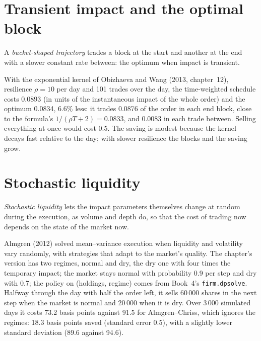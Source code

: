 \section{Transient impact and the optimal block}

\begin{definition}\label{def:mx:beyond-almgren-chriss:bucket}
A \emph{bucket-shaped trajectory} trades a block at the start and another at the end with a slower constant rate between:
the optimum when impact is transient.
\end{definition}

With the exponential kernel of Obizhaeva and Wang (2013, chapter~12), resilience $\rho=10$ per day and 101 trades over the day, the time-weighted schedule
costs 0.0893 (in units of the instantaneous impact of the whole order) and the optimum 0.0834, 6.6\% less: it trades 0.0876 of the order in each end block,
close to the formula's $1/(\rho T+2)=0.0833$, and 0.0083 in each trade between. Selling everything at once would cost 0.5. The saving is modest because the
kernel decays fast relative to the day; with slower resilience the blocks and the saving grow.

\section{Stochastic liquidity}

\begin{definition}\label{def:mx:beyond-almgren-chriss:stochliq}
\emph{Stochastic liquidity} lets the impact parameters themselves change at random during the execution, as volume and
depth do, so that the cost of trading now depends on the state of the market now.
\end{definition}

Almgren (2012) solved mean--variance execution when liquidity and volatility vary randomly, with strategies that adapt to the market's quality. The
chapter's version has two regimes, normal and dry, the dry one with four times the temporary impact; the market stays normal with probability 0.9 per
step and dry with 0.7; the policy on (holdings, regime) comes from Book~4's \texttt{firm.dpsolve}. Halfway through the day with half the order left, it
sells 60\,000 shares in the next step when the market is normal and 20\,000 when it is dry. Over 3\,000 simulated days it costs 73.2 basis points against
91.5 for Almgren--Chriss, which ignores the regimes: 18.3 basis points saved (standard error 0.5), with a slightly lower standard deviation (89.6 against 94.6).

